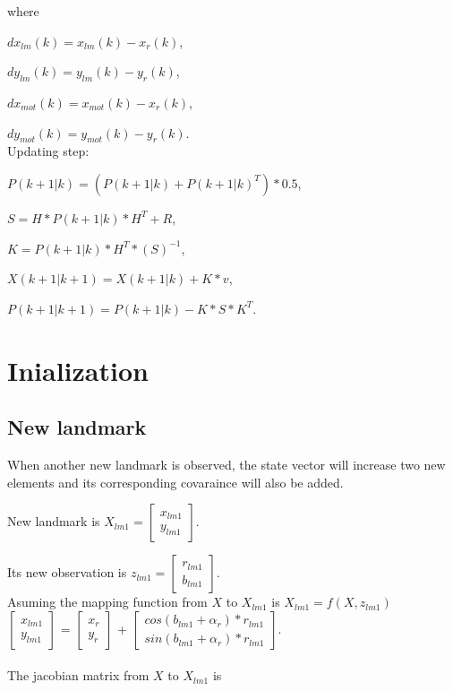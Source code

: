 \documentclass[11pt,a4paper]{article}
\begin{document}
where


$dx_{lm}(k)=x_{lm}(k)-x_{r}(k)$, 

$dy_{lm}(k)=y_{lm}(k)-y_{r}(k)$, 

$dx_{mot}(k)=x_{mot}(k)-x_{r}(k)$,

 $dy_{mot}(k)=y_{mot}(k)-y_{r}(k)$.
\\

Updating step:

$P(k+1|k) = (P(k+1|k) + P(k+1|k)^{T})*0.5$,

$S = H*P(k+1|k)*H^{T} + R$,

$K = P(k+1|k)*H^{T}*(S)^{-1}$,

$X(k+1|k+1) = X(k+1|k) + K*v$,

$P(k+1|k+1) = P(k+1|k) - K*S*K^{T}$. 


\section{Inialization}
\subsection{New landmark}
When another new landmark is observed, the state vector will increase two new elements and its corresponding covaraince will also be added.

\noindent New landmark is $ X_{lm1} =  \begin{bmatrix} x_{lm1} \\ y_{lm1} \end{bmatrix}$.

\noindent Its new observation is $z_{lm1} = \begin{bmatrix} r_{lm1} \\ b_{lm1} \end{bmatrix}$.
\\
Asuming the mapping function from $X$ to $X_{lm1}$ is $X_{lm1} = f(X,z_{lm1})$
\\
\noindent $\begin{bmatrix} x_{lm1} \\ y_{lm1} \end{bmatrix}$ = $\begin{bmatrix} x_{r} \\ y_{r} \end{bmatrix}$  +  $\begin{bmatrix}  cos(b_{lm1}+\alpha_{r})*r_{lm1}\\ sin(b_{lm1}+\alpha_{r})*r_{lm1} \end{bmatrix}$.
\\
\\
\noindent The jacobian matrix from $X$ to $X_{lm1}$ is 
\end{document}
